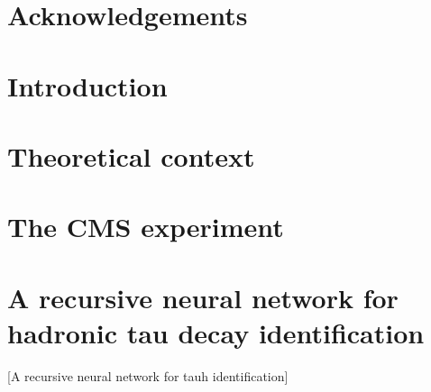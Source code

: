 \documentclass[12pt,twoside]{report}
\begin{document}

    


    \chapter*{Acknowledgements}

    {\hypersetup{linkcolor=black}
        \tableofcontents
        \listoffigures
        \listoftables
    }
        {\hypersetup{linkcolor=mycolor}}
    
    \chapter{Introduction} 
    
     
    \chapter{Theoretical context}
    

    \chapter{The CMS experiment}
    
    
    \chapter{A recursive neural network for hadronic tau decay identification}[A
    recursive neural network for tauh identification]
    \label{sec:RECNNchapter}
    
    
%     
    
\end{document}
